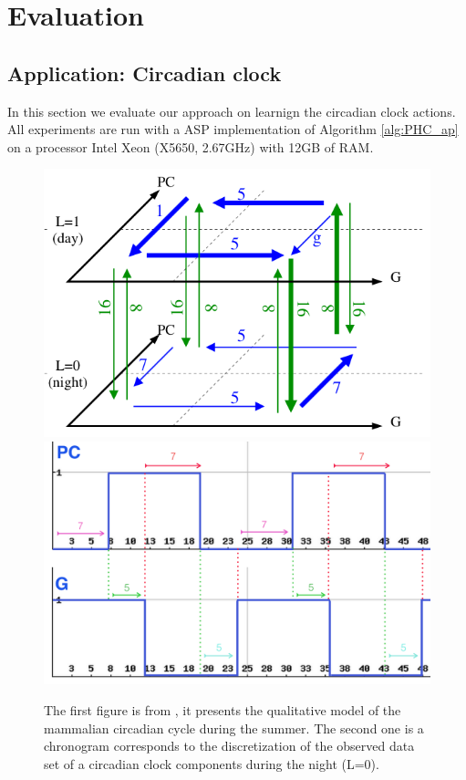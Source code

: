 \section{Evaluation}
\label{sec:evaluation}
\subsection{Application: Circadian clock}

In this section we evaluate our approach on learnign the circadian clock actions.
All experiments are run with a ASP implementation of Algorithm \ref{alg:PHC_ap} on a processor Intel Xeon (X5650, 2.67GHz) with 12GB of RAM.

\begin{figure}
\begin{center}
\includegraphics[width=0.4\linewidth]{images/circadianClock-summer.png}
\includegraphics[width=0.4\linewidth]{images/circadianClock-Courb.png}
\end{center}
\caption{The first figure is from \cite{comet2010formal}, it presents the qualitative model of the mammalian circadian cycle during the summer. The second one is a chronogram corresponds to the discretization of the observed data set of a circadian clock components during the night (L=0).}
\end{figure}

